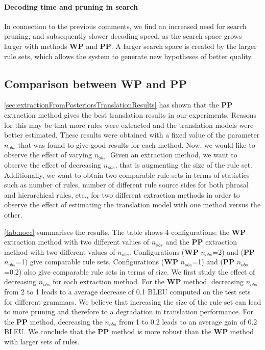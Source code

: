 \paragraph{Decoding time and pruning in search}

In connection to the previous
comments, we find an increased need for search pruning, and subsequently slower
decoding speed, as the search space grows larger with methods {\bf WP} and
{\bf PP}. A larger search space is created by the larger rule sets, which allows
the system to generate new hypotheses of better quality.

\subsection{Comparison between {\bf WP} and {\bf PP}}
\label{sec:extractionFromPosteriorsComparisonWPPP}

\autoref{sec:extractionFromPosteriorsTranslationResults} has shown that the
{\bf PP} extraction method gives the best translation results
in our experiments. Reasons for
this may be that more rules were extracted and the translation models were
better estimated. These results were obtained with a fixed value of the
parameter $n_{obs}$ that was found to give good results for each method. Now, we
would like to observe the effect of varying $n_{obs}$. Given an extraction
method, we want to observe the effect of decreasing $n_{obs}$, that is
augmenting the size of the rule set. Additionally, we want to obtain two
comparable rule sets in terms of statistics such as number of rules, number of
different rule source sides for both phrasal and hierarchical rules, etc., for
two different extraction methods in order to observe the effect of estimating
the translation model with one method versus the other.

\autoref{tab:nocc} summarises the results.
The table shows 4 configurations: the {\bf WP}
extraction method with two different values of $n_{obs}$ and the {\bf PP}
extraction method with two different values of $n_{obs}$. Configurations
({\bf WP} $n_{obs}$=2) and ({\bf PP} $n_{obs}$=1) give comparable rule sets.
Configurations ({\bf WP} $n_{obs}$=1) and ({\bf PP} $n_{obs}$=0.2) also give
comparable rule sets in terms of size. We
first study the effect of decreasing $n_{obs}$ for each
extraction method. For the {\bf WP} method, decreasing $n_{obs}$ from 2 to 1
leads to a average decrease of 0.1 BLEU computed on the test sets for different
grammars. We believe that increasing the size of the rule set can lead to more
pruning and therefore to a degradation in translation performance. For the
{\bf PP} method, decreasing the $n_{obs}$ from 1 to 0.2 leads to an average gain
of 0.2 BLEU. We conclude that the {\bf PP} method is more robust than the
{\bf WP} method with larger sets of rules.

